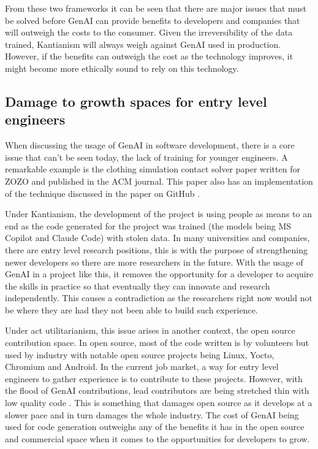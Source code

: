 From these two frameworks it can be seen that there are major issues that must be solved before GenAI can provide benefits to developers and companies that will outweigh the costs to the consumer. Given the irreversibility of the data trained, Kantianism will always weigh against GenAI used in production. However, if the benefits can outweigh the cost as the technology improves, it might become more ethically sound to rely on this technology.

\subsection{Damage to growth spaces for entry level engineers}
When discussing the usage of GenAI in software development, there is a core issue that can't be seen today, the lack of training for younger engineers. A remarkable example is the clothing simulation contact solver paper written for ZOZO and published in the ACM journal. This paper also has an implementation of the technique discussed in the paper on GitHub \cite{ppf-solver-whitepaper, ppf-solver}.

Under Kantianism, the development of the project is using people as means to an end as the code generated for the project was trained (the models being MS Copilot and Claude Code) with stolen data. In many universities and companies, there are entry level research positions, this is with the purpose of strengthening newer developers so there are more researchers in the future. With the usage of GenAI in a project like this, it removes the opportunity for a developer to acquire the skills in practice so that eventually they can innovate and research independently. This causes a contradiction as the researchers right now would not be where they are had they not been able to build such experience.

Under act utilitarianism, this issue arises in another context, the open source contribution space. In open source, most of the code written is by volunteers but used by industry with notable open source projects being Linux, Yocto, Chromium and Android. In the current job market, a way for entry level engineers to gather experience is to contribute to these projects. However, with the flood of GenAI contributions, lead contributors are being stretched thin with low quality code \cite{open-source-bother}. This is something that damages open source as it develops at a slower pace and in turn damages the whole industry. The cost of GenAI being used for code generation outweighs any of the benefits it has in the open source and commercial space when it comes to the opportunities for developers to grow.

